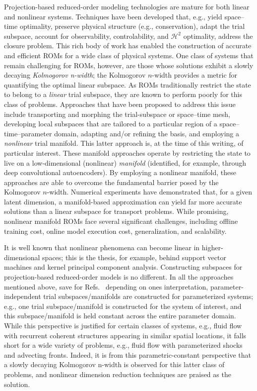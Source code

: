 \documentclass[3p,computermodern,10pt]{elsarticle}
\begin{document}
Projection-based reduced-order modeling technologies are mature for both linear and nonlinear systems. Techniques have been developed that, e.g., yield space--time optimality, preserve physical structure (e.g., conservation), adapt the trial subspace, account for observability, controlability, and $\mathcal{H}^2$ optimality, address the closure problem. This rich body of work has enabled the construction of accurate and efficient ROMs for a wide class of physical systems. One class of systems that remain challenging for ROMs, however, are those whose solutions exhibit a slowly decaying \textit{Kolmogorov n-width}; the Kolmogorov $n$-width provides a metric for quantifying the optimal linear subspace. As ROMs traditionally restrict the state to belong to a \textit{linear} trial subspace, they are known to perform poorly for this class of problems. Approaches that have been proposed to address this issue include transporting and morphing the trial-subspace or space--time mesh, developing local subspaces that are tailored to a particular region of a space--time--parameter domain, adapting and/or refining the basis, and employing a \textit{nonlinear} trial manifold. This latter approach is, at the time of this writing, of particular interest. These manifold approaches operate by restricting the state to live on a low-dimensional (nonlinear) \textit{manifold} (identified, for example, through deep convolutional autoencoders). By employing a nonlinear manifold, these approaches are able to overcome the fundamental barrier posed by the Kolmogorov $n$-width. Numerical experiments have demonstrated that, for a given latent dimension, a manifold-based approximation can yield far more accurate solutions than a linear subspace for transport problems. While promising, nonlinear manifold ROMs face several significant challenges, including offline training cost, online model execution cost, generalization, and scalability. 

It is well known that nonlinear phenomena can become linear in higher-dimensional spaces; this is the thesis, for example, behind support vector machines and kernel principal component analysis. Constructing subspaces for projection-based reduced-order models is no different. In all the approaches mentioned above, save for Refs.~\cite{} depending on ones interpretation, parameter-independent trial subspaces/manifolds are constructed for parameterized systems; e.g., one trial subspace/manifold is constructed for the system of interest, and this subspace/manifold is held constant across the entire parameter domain. While this perspective is justified for certain classes of systems, e.g., fluid flow with recurrent coherent structures appearing in similar spatial locations, it falls short for a wide variety of problems, e.g., fluid flow with parameterized shocks and advecting fronts.  Indeed, it is from this parametric-constant perspective that a slowly decaying Kolmogorov n-width is observed for this latter class of problems, and nonlinear dimension reduction techniques are praised as the solution.
\end{document}
